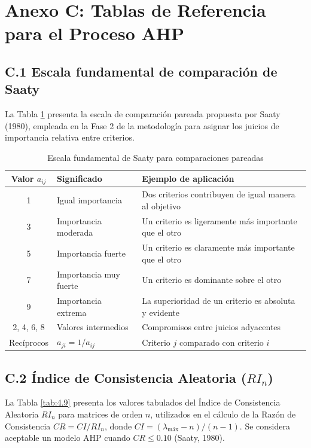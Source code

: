 \section*{Anexo C: Tablas de Referencia para el Proceso AHP}

\subsection*{C.1 Escala fundamental de comparación de Saaty}

La Tabla \ref{tab:4.8} presenta la escala de comparación pareada propuesta
por Saaty (1980), empleada en la Fase 2 de la metodología para asignar los
juicios de importancia relativa entre criterios.

\begin{table}[htbp]
\centering
\caption{Escala fundamental de Saaty para comparaciones pareadas}
\label{tab:4.8}
\small
\begin{tabular}{@{}cp{4cm}p{6.5cm}@{}}
\toprule
Valor $a_{ij}$ & Significado & Ejemplo de aplicación \\
\midrule
1         & Igual importancia          & Dos criterios contribuyen de igual manera al objetivo \\
3         & Importancia moderada       & Un criterio es ligeramente más importante que el otro \\
5         & Importancia fuerte         & Un criterio es claramente más importante que el otro \\
7         & Importancia muy fuerte     & Un criterio es dominante sobre el otro \\
9         & Importancia extrema        & La superioridad de un criterio es absoluta y evidente \\
2, 4, 6, 8 & Valores intermedios        & Compromisos entre juicios adyacentes \\
Recíprocos & $a_{ji} = 1/a_{ij}$        & Criterio $j$ comparado con criterio $i$ \\
\bottomrule
\end{tabular}
\end{table}

\subsection*{C.2 Índice de Consistencia Aleatoria ($RI_n$)}

La Tabla \ref{tab:4.9} presenta los valores tabulados del Índice de
Consistencia Aleatoria $RI_n$ para matrices de orden $n$, utilizados en el
cálculo de la Razón de Consistencia $CR = CI/RI_n$, donde $CI = (\lambda_{
\text{máx}} - n)/(n-1)$. Se considera aceptable un modelo AHP cuando $CR
\leq 0.10$ (Saaty, 1980).

